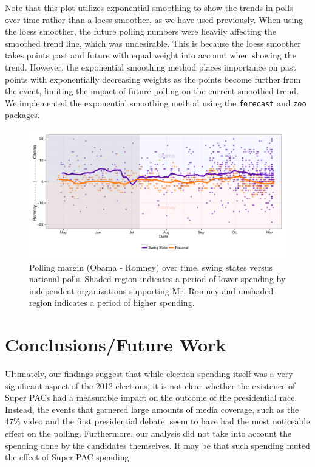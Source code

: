 \documentclass[11pt]{article}\usepackage{graphicx, color}
\newenvironment{knitrout}{}{} %
\begin{document}
Note that this plot utilizes exponential smoothing to show the trends in polls over time rather than a loess smoother, as we have used previously. When using the loess smoother, the future polling numbers were heavily affecting the smoothed trend line, which was undesirable. This is because the loess smoother takes points past and future with equal weight into account when showing the trend. However, the exponential smoothing method places importance on past points with exponentially decreasing weights as the points become further from the event, limiting the impact of future polling on the current smoothed trend. We implemented the exponential smoothing method using the \texttt{forecast} and \texttt{zoo} packages.

\begin{knitrout}
\color{fgcolor}\begin{figure}[H]


{\centering \includegraphics[width=\textwidth]{figure/effect_plot} 

}

\caption[Polling margin (Obama - Romney) over time, swing states versus national polls]{Polling margin (Obama - Romney) over time, swing states versus national polls. Shaded region indicates a period of lower spending by independent organizations supporting Mr. Romney and unshaded region indicates a period of higher spending.\label{fig:effect_plot}}
\end{figure}


\end{knitrout}


\section{Conclusions/Future Work}
Ultimately, our findings suggest that while election spending itself was a very significant aspect of the 2012 elections, it is not clear whether the existence of Super PACs had a measurable impact on the outcome of the presidential race. Instead, the events that garnered large amounts of media coverage, such as the 47\% video and the first presidential debate, seem to have had the most noticeable effect on the polling. Furthermore, our analysis did not take into account the spending done by the candidates themselves. It may be that such spending muted the effect of Super PAC spending.
\end{document}
